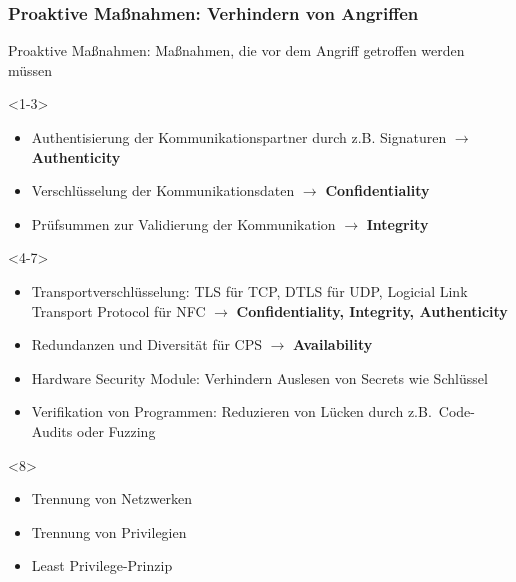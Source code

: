 \documentclass{sikslides}
\begin{document}
    \begin{frame}[t]
        \frametitle{Proaktive Maßnahmen: Verhindern von Angriffen}
        \begin{overlayarea}{\linewidth}{1cm}
            \begin{block}{}
                Proaktive Maßnahmen: Maßnahmen, die vor dem Angriff getroffen werden müssen
            \end{block}
        \end{overlayarea}

        \vspace{2cm}

        \begin{onlyenv}<1-3>
            \begin{itemize}[<+->]
                \item Authentisierung der Kommunikationspartner durch z.B. Signaturen $\rightarrow$ \textbf{Authenticity}
                \item Verschlüsselung der Kommunikationsdaten $\rightarrow$ \textbf{Confidentiality}
                \item Prüfsummen zur Validierung der Kommunikation $\rightarrow$ \textbf{Integrity}
            \end{itemize}

        \end{onlyenv}


        \begin{onlyenv}<4-7>
            \begin{itemize}[<+->]
                \item Transportverschlüsselung: TLS für TCP, DTLS für UDP, Logicial Link Transport Protocol für NFC $\rightarrow$ \textbf{Confidentiality, Integrity, Authenticity}
                \item Redundanzen und Diversität für CPS $\rightarrow$ \textbf{Availability}
                \item Hardware Security Module: Verhindern Auslesen von Secrets wie Schlüssel
                \item Verifikation von Programmen: Reduzieren von Lücken durch z.B.\ Code-Audits oder Fuzzing
            \end{itemize}
        \end{onlyenv}

        \begin{onlyenv}<8>
            \begin{itemize}
                \item Trennung von Netzwerken
                \item Trennung von Privilegien
                \item Least Privilege-Prinzip
                \pause
            \end{itemize}
        \end{onlyenv}


\end{frame}
\end{document}
